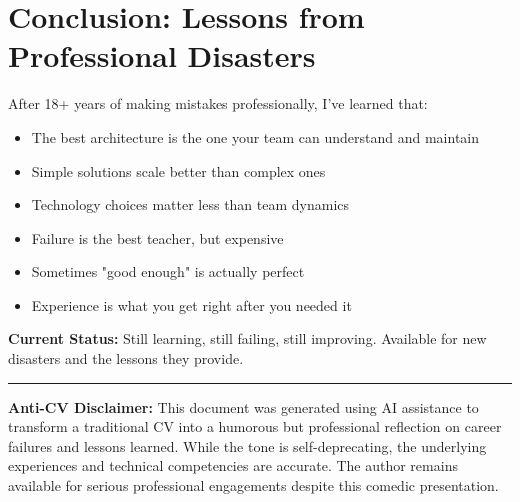 \documentclass[10pt,a4paper]{article}
\begin{document}
\section{Conclusion: Lessons from Professional Disasters}

After 18+ years of making mistakes professionally, I've learned that:

\begin{itemize}[leftmargin=10pt,itemsep=1pt]
\item The best architecture is the one your team can understand and maintain
\item Simple solutions scale better than complex ones
\item Technology choices matter less than team dynamics
\item Failure is the best teacher, but expensive
\item Sometimes "good enough" is actually perfect
\item Experience is what you get right after you needed it
\end{itemize}

\textbf{Current Status:} Still learning, still failing, still improving. Available for new disasters and the lessons they provide.

\vspace{10pt}
\hrule
\vspace{4pt}
\footnotesize
\textbf{Anti-CV Disclaimer:} This document was generated using AI assistance to transform a traditional CV into a humorous but professional reflection on career failures and lessons learned. While the tone is self-deprecating, the underlying experiences and technical competencies are accurate. The author remains available for serious professional engagements despite this comedic presentation.
\end{document}
